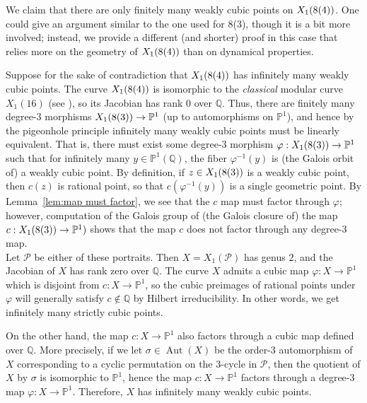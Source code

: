 \documentclass[12pt]{amsart}
\theoremstyle{definition}
\newcommand{\bbP}{\mathbb{P}}
\newcommand{\bbQ}{\mathbb{Q}}
\newcommand{\calP}{\mathcal{P}}
\newcommand{\Aut}{\operatorname{Aut}}
\numberwithin{equation}{section}
\begin{document}
We claim that there are only finitely many weakly cubic points on $X_1({\rm 8(4)})$. One could give an argument similar to the one used for 8(3), though it is a bit more involved; instead, we provide a different (and shorter) proof in this case that relies more on the geometry of $X_1({\rm 8(4)})$ than on dynamical properties.

Suppose for the sake of contradiction that $X_1({\rm 8(4)})$ has infinitely many weakly cubic points. The curve $X_1({\rm 8(4)})$ is isomorphic to the \textit{classical} modular curve $X_1(16)$ (see \cite[p. 93]{morton:1998}), so its Jacobian has rank $0$ over $\bbQ$. Thus, there are finitely many degree-$3$ morphisms $X_1({\rm 8(3)}) \to \bbP^1$ (up to automorphisms on $\bbP^1$), and hence by the pigeonhole principle infinitely many weakly cubic points must be linearly equivalent. That is, there must exist some degree-$3$ morphism $\varphi: X_1({\rm 8(3)}) \to \bbP^1$ such that for infinitely many $y \in \bbP^1(\mathbb{Q})$, the fiber $\varphi^{-1}(y)$ is (the Galois orbit of) a weakly cubic point. By definition, if $z \in X_1({\rm 8(3)})$ is a weakly cubic point, then $c(z)$ is rational point, so that $c(\varphi^{-1}(y))$ is a single geometric point. By Lemma~\ref{lem:map must factor}, we see that the $c$ map must factor through $\varphi$; however, computation of the Galois group of (the Galois closure of) the map $c: X_1({\rm 8(3)}) \to \bbP^1)$ shows that the map $c$ does not factor through any degree-$3$ map.\\

 Let $\calP$ be either of these portraits. Then $X = X_1(\calP)$ has genus $2$, and the Jacobian of $X$ has rank zero over $\bbQ$. The curve $X$ admits a cubic map $\varphi : X \to \bbP^1$ which is disjoint from $c : X \to \bbP^1$, so the cubic preimages of rational points under $\varphi$ will generally satisfy $c \notin \bbQ$ by Hilbert irreducibility. 
In other words, we get infinitely many strictly cubic points.

On the other hand, the map $c : X \to \bbP^1$ also factors through a cubic map defined over $\bbQ$. More precisely, if we let $\sigma\in\Aut(X)$ be the order-$3$ automorphism of $X$ corresponding to a cyclic permutation on the $3$-cycle in $\calP$, then the quotient of $X$ by $\sigma$ is isomorphic to $\bbP^1$, hence the map $c : X \to \bbP^1$ factors through a degree-$3$ map $\varphi : X \to \bbP^1$. Therefore, $X$ has infinitely many weakly cubic points.\\
\end{document}
